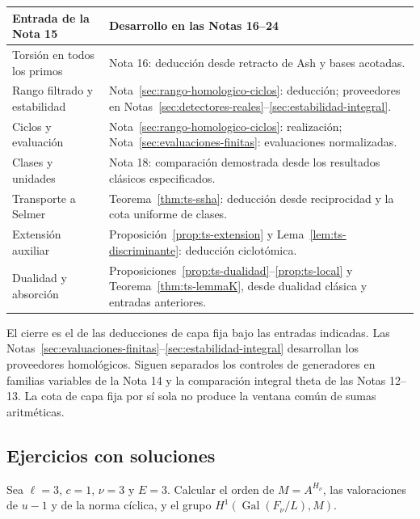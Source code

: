 \begin{center}\small
\begin{tabularx}{\textwidth}{@{}p{}Y@{}}
\toprule
Entrada de la Nota 15 & Desarrollo en las Notas 16--24\\\midrule
Torsión en todos los primos & Nota 16: deducción desde retracto de Ash y bases acotadas.\\
Rango filtrado y estabilidad & Nota~\ref{sec:rango-homologico-ciclos}: deducción; proveedores en Notas~\ref{sec:detectores-reales}--\ref{sec:estabilidad-integral}.\\
Ciclos y evaluación & Nota~\ref{sec:rango-homologico-ciclos}: realización; Nota~\ref{sec:evaluaciones-finitas}: evaluaciones normalizadas.\\
Clases y unidades & Nota 18: comparación demostrada desde los resultados clásicos especificados.\\
Transporte a Selmer & Teorema~\ref{thm:ts-ssha}: deducción desde reciprocidad y la cota uniforme de clases.\\
Extensión auxiliar & Proposición~\ref{prop:ts-extension} y Lema~\ref{lem:ts-discriminante}: deducción ciclotómica.\\
Dualidad y absorción & Proposiciones~\ref{prop:ts-dualidad}--\ref{prop:ts-local} y Teorema~\ref{thm:ts-lemmaK}, desde dualidad clásica y entradas anteriores.\\\bottomrule
\end{tabularx}
\end{center}

El cierre es el de las deducciones de capa fija bajo las entradas indicadas. Las Notas~\ref{sec:evaluaciones-finitas}--\ref{sec:estabilidad-integral} desarrollan los proveedores homológicos. Siguen separados los controles de generadores en familias variables de la Nota 14 y la comparación integral theta de las Notas 12--13. La cota de capa fija por sí sola no produce la ventana común de sumas aritméticas.

\subsection{Ejercicios con soluciones}

\begin{ejercicio}
Sea $\ell=3$, $c=1$, $\nu=3$ y $E=3$. Calcular el orden de $M=A^{H_\nu}$, las valoraciones de $u-1$ y de la norma cíclica, y el grupo $H^1(\operatorname{Gal}(F_\nu/L),M)$.
\end{ejercicio}
